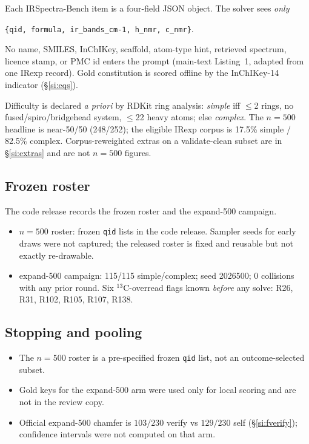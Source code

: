 \documentclass[11pt]{article}
\begin{document}
Each IRSpectra-Bench item is a four-field JSON object. The solver sees
\emph{only}
\begin{center}
\texttt{\{qid, formula, ir\_bands\_cm-1, h\_nmr, c\_nmr\}}.
\end{center}
No name, SMILES, InChIKey, scaffold, atom-type hint, retrieved spectrum,
licence stamp, or PMC id enters the prompt
(main-text Listing~1, adapted from one IRexp record).
Gold constitution is scored offline by the InChIKey-14 indicator
(\S\ref{si:eqs}).

Difficulty is declared \emph{a priori} by RDKit ring analysis:
\emph{simple} iff $\leq$2 rings, no fused/spiro/bridgehead system,
$\leq$22 heavy atoms; else \emph{complex}.
The $n{=}500$ headline is near-50/50 (248/252);
the eligible IRexp corpus is 17.5\% simple / 82.5\% complex.
Corpus-reweighted extras on a validate-clean subset are in
\S\ref{si:extras} and are not $n{=}500$ figures.

\subsection{Frozen roster}

The code release records the frozen roster and the expand-500 campaign.

\begin{itemize}
  \item $n{=}500$ roster: frozen \texttt{qid} lists in the code release.
        Sampler seeds for early draws were not captured; the released
        roster is fixed and reusable but not exactly re-drawable.
  \item expand-500 campaign: 115/115 simple/complex; seed 2026500;
        0 collisions with any prior round.
        Six $^{13}$C-overread flags known \emph{before} any solve:
        R26, R31, R102, R105, R107, R138.
\end{itemize}

\subsection{Stopping and pooling}

\begin{itemize}
  \item The $n{=}500$ roster is a pre-specified frozen \texttt{qid} list,
        not an outcome-selected subset.
  \item Gold keys for the expand-500 arm were used only for local scoring
        and are not in the review copy.
  \item Official expand-500 chamfer is $103/230$ verify vs $129/230$ self
        (\S\ref{si:fverify}); confidence intervals were not computed on
        that arm.
\end{itemize}
\end{document}

